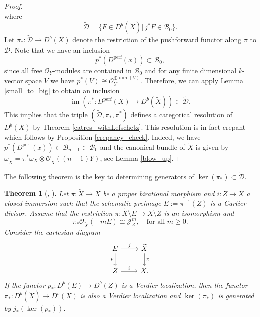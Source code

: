 \documentclass[a4paper, twoside, 11pt]{amsart}
\newtheorem{theorem}{Theorem}[section]
\theoremstyle{definition}
\theoremstyle{remark}
\numberwithin{equation}{theorem}
\DeclareMathOperator{\im}{im}
\DeclareMathOperator{\lilperf}{perf}
\newcommand{\dbx}{D^b(X)}
\begin{document}
\begin{proof}
\begin{equation}
	\end{equation} 
	where 
	\begin{equation*}
		\widetilde{\mathcal{D}} = \{F \in D^b(\widetilde{X}) | \ j^*F \in \mathcal{B}_0\}.
	\end{equation*}
    Let $\pi_*\colon \widetilde{\mathcal{D}} \to \dbx$ denote the restriction of the pushforward functor along $\pi$ to $\widetilde{\mathcal{D}}$.
    Note that we have an inclusion 
    \begin{equation}\label{inclusion}
		p^*(D^{\lilperf}(x)) \subset \mathcal{B}_0,
	\end{equation}
    since all free $\mathcal{O}_Y$-modules are contained in $\mathcal{B}_0$ and for any finite dimensional $k$-vector space $V$ we have $p^*(V) \cong \mathcal{O}_Y^{\oplus \dim(V)}$. Therefore, we can apply Lemma \ref{small_to_big} to obtain an inclusion
    \begin{equation*}
        \im(\pi^* \colon D^{\lilperf}(X) \to D^b(\widetilde{X})) \subset \widetilde{\mathcal{D}}.
    \end{equation*}
    This implies that the triple $(\widetilde{\mathcal{D}}, \pi_*, \pi^*)$ defines a categorical resolution of $\dbx$ by Theorem \ref{catres_withLefschetz}. This resolution is in fact crepant which follows by Proposition \ref{crepancy_check}. Indeed, we have $p^*(D^{\lilperf}(x)) \subset \mathcal{B}_{n-1} \subset \mathcal{B}_0$ and the canonical bundle of $\widetilde{X}$ is given by $\omega_{\widetilde{X}} = \pi^*\omega_X \otimes \mathcal{O}_{\widetilde{X}}((n-1)Y)$, see Lemma \ref{blow_up}.
\end{proof}
The following theorem is the key to determining generators of $\ker(\pi_*) \subset \widetilde{\mathcal{D}}$.
\begin{theorem}[{\cite[Theorem 8.22]{Efimov_key}, \cite[Theorem 5.2]{categorical_absorptions}}]\label{efimov}
	Let $\pi\colon \widetilde{X} \to X$ be a proper birational morphism and $i\colon Z \to X$ a closed immersion such that the schematic preimage $E := \pi^{-1}(Z)$ is a Cartier divisor. Assume that the restriction $\pi\colon \widetilde{X}\setminus E \to X\setminus Z$ is an isomorphism and 
	\begin{equation}\label{good_loci}
		\pi_*\mathcal{O}_{\widetilde{X}}(-mE) \cong \mathcal{J}_Z^m, \quad \text{for all } m \geq 0. 
	\end{equation}
	Consider the cartesian diagram
	\begin{equation*}
		\begin{tikzcd}
			E \arrow[r, "j"] \arrow[d, "p"'] & \widetilde{X} \arrow[d, "\pi"] \\
			Z \arrow[r, "i"]                         & X.               
		\end{tikzcd}
	\end{equation*}
	If the functor $p_*\colon D^b(E) \to D^b(Z)$ is a Verdier localization, then the functor $\pi_*\colon D^b(\widetilde{X}) \to \dbx$ is also a Verdier localization and $\ker(\pi_*)$ is generated by $j_*(\ker(p_*))$. 
\end{theorem}
\end{document}
